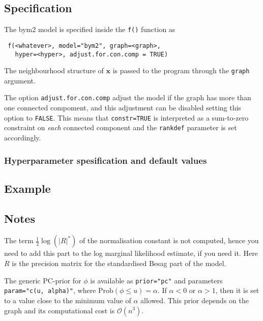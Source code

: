 \documentclass[a4paper,11pt]{article}
\begin{document}
\subsection*{Specification}

The bym2 model is specified inside the {\tt f()} function as
\begin{verbatim}
 f(<whatever>, model="bym2", graph=<graph>,
   hyper=<hyper>, adjust.for.con.comp = TRUE)
\end{verbatim}
The neighbourhood structure of $\mathbf{x}$ is passed to the program
through the {\tt graph} argument.

The option \verb|adjust.for.con.comp| adjust the model if the graph
has more than one connected compoment, and this adjustment can be
disabled setting this option to \texttt{FALSE}. This means that
\texttt{constr=TRUE} is interpreted as a sum-to-zero constraint on
\emph{each} connected component and the \texttt{rankdef} parameter is
set accordingly. 

\subsubsection*{Hyperparameter spesification and default values}



\subsection*{Example}


\subsection*{Notes}

The term $\frac{1}{2}\log(|R|^{*})$ of the normalisation constant is
not computed, hence you need to add this part to the log marginal
likelihood estimate, if you need it. Here $R$ is the precision matrix
for the standardised Besag part of the model.

The generic PC-prior for $\phi$ is available as \texttt{prior="pc"}
and parameters \texttt{param="c(u, alpha)"}, where $\text{Prob}(\phi
\le u) = \alpha$. If $\alpha < 0$ or $\alpha>1$, then it is set to a value
close to the minimum value of $\alpha$ allowed. This prior depends on
the graph and its computational cost is ${\mathcal O}(n^{3})$.
\end{document}
